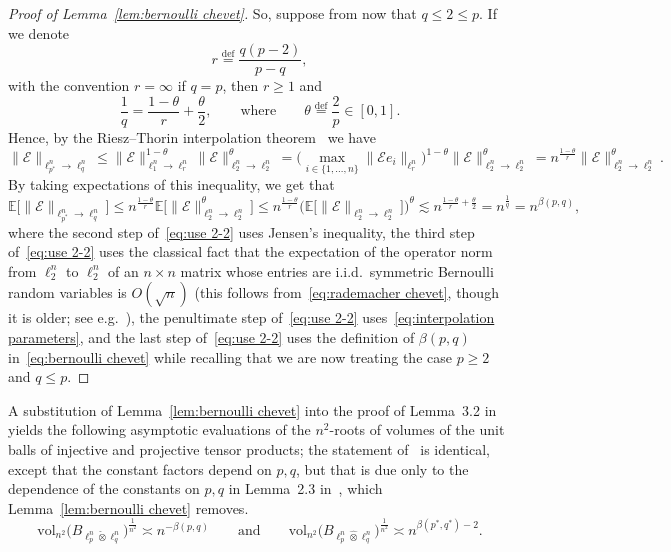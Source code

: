 \documentclass[11pt,reqno]{amsart}
\renewcommand{\le}{\leqslant}
\renewcommand{\ge}{\geqslant}
\newcommand{\n}{\{1,\ldots,n\}}
\theoremstyle{remark}
\newcommand{\E}{\mathbb{ E}}
\newcommand{\eqdef}{\stackrel{\mathrm{def}}{=}}
\newcommand{\vol}{\mathrm{vol}}
\renewcommand{\1}{\mathbf 1}
\newcommand{\tp}{\hat{\otimes}}
\newcommand{\ti}{\check{\otimes}}
\begin{document}
\begin{proof}[Proof of Lemma~\ref{lem:bernoulli chevet}]
So, suppose from now that $q\le 2\le p$. If we denote
$$
r\eqdef \frac{q(p-2)}{p-q},
$$
with the convention $r=\infty$ if $q=p$, then $r\ge 1$ and
\begin{equation}\label{eq:interpolation parameters}
\frac{1}{q}=\frac{1-\theta}{r}+\frac{\theta}{2},\qquad\mathrm{where}\qquad \theta\eqdef \frac{2}{p}\in [0,1].
\end{equation}
Hence, by the Riesz--Thorin interpolation theorem~\cite{Rie27,Tho48} we have
$$
\|\mathscr{E}\|_{\ell_{\!\!p^*}^n\to \ell_q^n}\le \|\mathscr{E}\|_{\ell_{1}^n\to \ell_r^n}^{1-\theta} \|\mathscr{E}\|_{\ell_{2}^n\to \ell_2^n}^{\theta}=\Big(\max_{i\in \n} \big\|\mathscr{E}e_i\big\|_{\ell_r^n}\Big)^{1-\theta}\|\mathscr{E}\|_{\ell_{2}^n\to \ell_2^n}^{\theta}=
n^{\frac{1-\theta}{r}}\|\mathscr{E}\|_{\ell_{2}^n\to \ell_2^n}^{\theta}.
$$
By taking expectations of this inequality, we get that
\begin{equation}\label{eq:use 2-2}
\E \big[\|\mathscr{E}\|_{\ell_{\!\! p^*}^n\to \ell_q^n}\big]\le n^{\frac{1-\theta}{r}}\E\big[\|\mathscr{E}\|_{\ell_{2}^n\to \ell_2^n}^{\theta}\big]\le
n^{\frac{1-\theta}{r}}\Big(\E\big[\|\mathscr{E}\|_{\ell_{2}^n\to \ell_2^n}\big]\Big)^\theta\lesssim  n^{\frac{1-\theta}{r}+\frac{\theta}{2}}=n^{\frac{1}{q}}=n^{\beta(p,q)},
\end{equation}
where the second step of~\eqref{eq:use 2-2} uses Jensen's inequality, the third step of~\eqref{eq:use 2-2} uses the classical fact that the expectation of the operator norm from $\ell_2^n$ to $\ell_2^n$ of an $n\times n$ matrix whose entries are i.i.d.~symmetric Bernoulli random variables is  $O(\sqrt{n})$ (this follows from~\eqref{eq:rademacher chevet}, though it is older; see e.g.~\cite{BGN75}), the penultimate step of~\eqref{eq:use 2-2} uses~\eqref{eq:interpolation parameters}, and the last step of~\eqref{eq:use 2-2}  uses the definition of $\beta(p,q)$ in~\eqref{eq:bernoulli chevet} while recalling that we are now treating the case $p\ge 2$ and $q\le p$.
\end{proof}

A substitution of Lemma~\ref{lem:bernoulli chevet}  into the proof of  Lemma~3.2 in~\cite{Sch82} yields the following asymptotic evaluations of the $n^2$-roots of volumes of the unit balls of injective and projective tensor products; the statement of~\cite[Lemma~3.2]{Sch82} is identical, except that the constant factors depend on $p,q$, but  that is due only to the dependence of the constants on $p,q$ in Lemma~2.3 in~\cite{Sch82}, which Lemma~\ref{lem:bernoulli chevet} removes.
\begin{equation}\label{eq:lower volume radius injective}
\vol_{n^2} \big(B_{\ell_p^n\ti \ell_q^n}\big)^{\frac{1}{n^2}}\asymp  n^{-\beta(p,q)}\qquad \mathrm{and}\qquad \vol_{n^2} \big(B_{\ell_p^n\tp \ell_q^n}\big)^{\frac{1}{n^2}}\asymp n^{\beta(p^*,q^*)-2}.
\end{equation}
\end{document}
